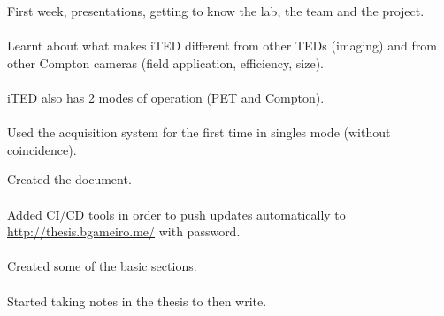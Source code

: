 \begin{minipage}[t][0.45\textheight][t]{0.97\linewidth}
\begin{minipage}[t]{0.49\textwidth}
  \end{minipage}
  \begin{minipage}[t]{0.49\textwidth}
    \begin{minipage}[t][0.22\textheight][t]{\textwidth}
        First week, presentations, getting to know the lab, the team and the project.\\~\\
        Learnt about what makes iTED different from other TEDs (imaging) and from other Compton cameras (field application, efficiency, size).\\~\\
        iTED also has 2 modes of operation (PET and Compton).\\~\\
        Used the acquisition system for the first time in singles mode (without coincidence).
    \end{minipage}
    \begin{minipage}[t][0.22\textheight][t]{\textwidth}
        Created the document.\\~\\
        Added CI/CD tools in order to push updates automatically to \url{http://thesis.bgameiro.me/} with password.\\~\\
        Created some of the basic sections.\\~\\
        Started taking notes in the thesis to then write.
    \end{minipage}
  \end{minipage}  
\end{minipage}

